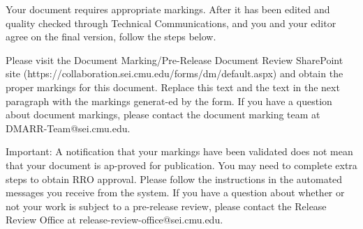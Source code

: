 Your document requires appropriate markings. After it has been edited and quality checked through Technical Communications, and you and your editor agree on the final version, follow the steps below.

Please visit the Document Marking/Pre-Release Document Review SharePoint site (https://collaboration.sei.cmu.edu/forms/dm/default.aspx) and obtain the proper markings for this document. Replace this text and the text in the next paragraph with the markings generat-ed by the form. If you have a question about document markings, please contact the document marking team at DMARR-Team@sei.cmu.edu. 

Important: A notification that your markings have been validated does not mean that your document is ap-proved for publication. You may need to complete extra steps to obtain RRO approval. Please follow the instructions in the automated messages you receive from the system. If you have a question about whether or not your work is subject to a pre-release review, please contact the Release Review Office at release-review-office@sei.cmu.edu. 

